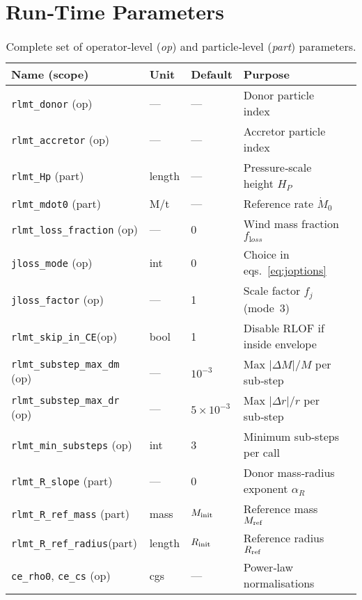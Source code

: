 \documentclass[11pt]{article}
\begin{document}
\section{Run‑Time Parameters}
\label{sec:param_table}

\begin{table}[h]
\centering\footnotesize
\caption{Complete set of operator‐level (\textit{op}) and
particle‑level (\textit{part}) parameters.}
\label{tab:params}
\begin{tabular}{@{}lllll@{}}
\toprule
Name (scope) & Unit & Default & Purpose \\
\midrule
\texttt{rlmt\_donor}      (op)   & —        & — & Donor particle index\\
\texttt{rlmt\_accretor}   (op)   & —        & — & Accretor particle index\\
\texttt{rlmt\_Hp}         (part) & length   & — & Pressure‐scale height $H_P$\\
\texttt{rlmt\_mdot0}      (part) & M/t      & — & Reference rate $\dot M_0$\\[0.2em]
%
\texttt{rlmt\_loss\_fraction} (op) & —      & 0 & Wind mass fraction $f_{\mathrm loss}$\\
\texttt{jloss\_mode}      (op)   & int      & 0 & Choice in eqs.~\eqref{eq:joptions}\\
\texttt{jloss\_factor}    (op)   & —        & 1 & Scale factor $f_j$ (mode 3)\\
\texttt{rlmt\_skip\_in\_CE}(op)  & bool     & 1 & Disable RLOF if inside envelope\\[0.2em]
%
\texttt{rlmt\_substep\_max\_dm} (op) & —    & $10^{-3}$ & Max $|\Delta M|/M$ per sub‑step\\
\texttt{rlmt\_substep\_max\_dr} (op) & —    & $5\times10^{-3}$ & Max $|\Delta r|/r$ per sub‑step\\
\texttt{rlmt\_min\_substeps}    (op) & int  & 3 & Minimum sub‑steps per call\\[0.2em]
%
\texttt{rlmt\_R\_slope}      (part) & —     & 0 & Donor mass‑radius exponent $\alpha_R$\\
\texttt{rlmt\_R\_ref\_mass}  (part) & mass  & $M_{\rm init}$ & Reference mass $M_{\rm ref}$\\
\texttt{rlmt\_R\_ref\_radius}(part) & length& $R_{\rm init}$ & Reference radius $R_{\rm ref}$\\[0.2em]
%
\texttt{ce\_rho0}, \texttt{ce\_cs}  (op) & cgs & — & Power‑law normalisations\\

\end{tabular}
\end{table}
\end{document}
